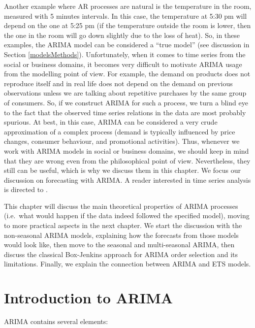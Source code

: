 \documentclass[
]{book}
\theoremstyle{definition}
\theoremstyle{definition}
\theoremstyle{definition}
\theoremstyle{definition}
\theoremstyle{remark}
\begin{document}
Another example where AR processes are natural is the temperature in the room, measured with 5 minutes intervals. In this case, the temperature at 5:30 pm will depend on the one at 5:25 pm (if the temperature outside the room is lower, then the one in the room will go down slightly due to the loss of heat). So, in these examples, the ARIMA model can be considered a ``true model'' (see discussion in Section \ref{modelsMethods}). Unfortunately, when it comes to time series from the social or business domains, it becomes very difficult to motivate ARIMA usage from the modelling point of view. For example, the demand on products does not reproduce itself and in real life does not depend on the demand on previous observations unless we are talking about repetitive purchases by the same group of consumers. So, if we construct ARIMA for such a process, we turn a blind eye to the fact that the observed time series relations in the data are most probably spurious. At best, in this case, ARIMA can be considered a very crude approximation of a complex process (demand is typically influenced by price changes, consumer behaviour, and promotional activities). Thus, whenever we work with ARIMA models in social or business domains, we should keep in mind that they are wrong even from the philosophical point of view. Nevertheless, they still can be useful, which is why we discuss them in this chapter. We focus our discussion on forecasting with ARIMA. A reader interested in time series analysis is directed to \citet{Box1976}.

This chapter will discuss the main theoretical properties of ARIMA processes (i.e.~what would happen if the data indeed followed the specified model), moving to more practical aspects in the next chapter. We start the discussion with the non-seasonal ARIMA models, explaining how the forecasts from those models would look like, then move to the seasonal and multi-seasonal ARIMA, then discuss the classical Box-Jenkins approach for ARIMA order selection and its limitations. Finally, we explain the connection between ARIMA and ETS models.

\hypertarget{ARIMAIntro}{%
\section{Introduction to ARIMA}\label{ARIMAIntro}}

ARIMA contains several elements:
\end{document}
